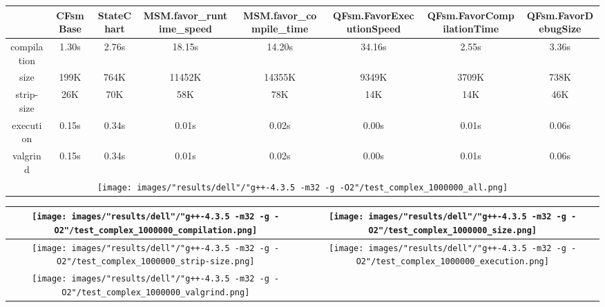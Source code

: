 \begin{landscape}
\begin{table}
\caption{"dell" [df6407d], g++-4.3.5 -m32 -g -O2/test complex 1000000}
\centering
\begin{longtable}{| c | c |c |c |c |c |c |c |}
\hline
& CFsmBase& StateChart& MSM.favor\_runtime\_speed& MSM.favor\_compile\_time& QFsm.FavorExecutionSpeed& QFsm.FavorCompilationTime& QFsm.FavorDebugSize\\
\hline
compilation & 1.30s & 2.76s & 18.15s & 14.20s & 34.16s & 2.55s & 3.36s\\
\hline
size & 199K & 764K & 11452K & 14355K & 9349K & 3709K & 738K\\
\hline
strip-size & 26K & 70K & 58K & 78K & 14K & 14K & 46K\\
\hline
execution & 0.15s & 0.34s & 0.01s & 0.02s & 0.00s & 0.01s & 0.06s\\
\hline
valgrind & 0.15s & 0.34s & 0.01s & 0.02s & 0.00s & 0.01s & 0.06s\\
\hline
\multicolumn{8}{|c|}{\texttt{[image: images/"results/dell"/"g++-4.3.5 -m32 -g -O2"/test\_complex\_1000000\_all.png]}}\\
\hline
\end{longtable}
\end{table}
\end{landscape}
\newpage
\begin{table}
\centering
\begin{longtable}{| c | c |}
\hline
\texttt{[image: images/"results/dell"/"g++-4.3.5 -m32 -g -O2"/test\_complex\_1000000\_compilation.png]}& \texttt{[image: images/"results/dell"/"g++-4.3.5 -m32 -g -O2"/test\_complex\_1000000\_size.png]}\\
\hline
\texttt{[image: images/"results/dell"/"g++-4.3.5 -m32 -g -O2"/test\_complex\_1000000\_strip-size.png]}& \texttt{[image: images/"results/dell"/"g++-4.3.5 -m32 -g -O2"/test\_complex\_1000000\_execution.png]}\\
\hline
\texttt{[image: images/"results/dell"/"g++-4.3.5 -m32 -g -O2"/test\_complex\_1000000\_valgrind.png]}& \\ \hline
\end{longtable}
\end{table}
